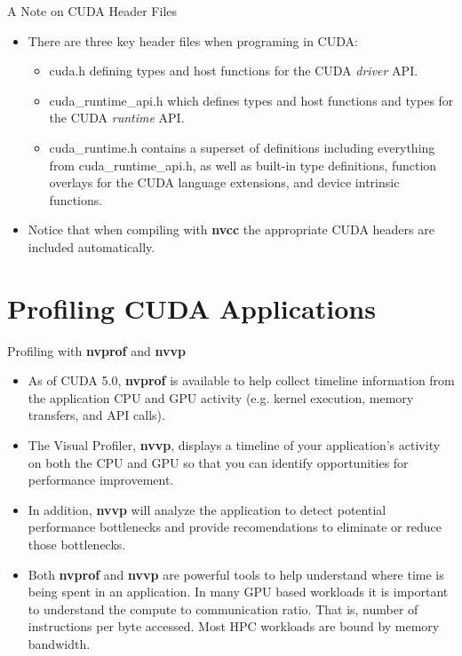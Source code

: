 \documentclass[handout]{beamer}
\begin{document}
\begin{frame}{A Note on CUDA Header Files}
\begin{itemize}
\itemsep1em
	\item<1->{There are three key header files when programing in CUDA:}
	\break
	\begin{itemize}
	\itemsep1em
		\item<1->{\selectfont cuda.h} defining types and host functions for the CUDA \emph{driver} API.
		\item<1->{\selectfont cuda\_runtime\_api.h} which defines types and host functions and types for the CUDA \emph{runtime} API. 
		\item<1->{\selectfont cuda\_runtime.h} contains a superset of definitions including everything from {\selectfont cuda\_runtime\_api.h}, as well as built-in type definitions, function overlays for the CUDA language extensions, and device intrinsic functions.
	\end{itemize}
	\item<1->Notice that when compiling with \textbf{{\selectfont nvcc}} the appropriate CUDA headers are included automatically.
\end{itemize}

\end{frame}


\section{Profiling CUDA Applications}
\begin{frame}{Profiling with \textbf{{\selectfont nvprof}} and \textbf{{\selectfont nvvp}}}
\begin{itemize}
	\item<1->As of CUDA 5.0, \textbf{{\selectfont nvprof}} is available to help collect timeline information from the application CPU and GPU activity (e.g. kernel execution, memory transfers, and API calls).
	\item<2->The Visual Profiler, \textbf{{\selectfont nvvp}}, displays a timeline of your application's activity on both the CPU and GPU so that you can identify opportunities for performance improvement. 
	\item<3->In addition, \textbf{{\selectfont nvvp}} will analyze the application to detect potential performance bottlenecks and provide recomendations to eliminate or reduce those bottlenecks.
	\item<4->Both \textbf{{\selectfont nvprof}} and \textbf{{\selectfont nvvp}} are powerful tools to help understand where time is being spent in an application.  In many GPU based workloads it is important to understand the compute to communication ratio.  That is, number of instructions per byte accessed. Most HPC workloads are bound by memory bandwidth.
\end{itemize}
\end{frame}
\end{document}
